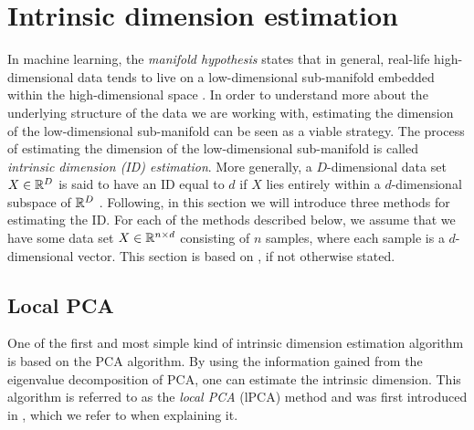 \section{Intrinsic dimension estimation}
In machine learning, the \textit{manifold hypothesis} states that in general, real-life high-dimensional data tends to live on a low-dimensional sub-manifold embedded within the high-dimensional space \cite[p. 16]{bengio2014representation}. In order to understand more about the underlying structure of the data we are working with, estimating the dimension of the low-dimensional sub-manifold can be seen as a viable strategy. The process of estimating the dimension of the low-dimensional sub-manifold is called \textit{intrinsic dimension (ID) estimation}. More generally, a $D$-dimensional data set $X \in \mathbb{R}^D$ is said to have an ID equal to $d$ if $X$ lies entirely within a $d$-dimensional subspace of $\mathbb{R}^D$ \cite{lee2015intrinsic}. Following, in this section we will introduce three methods for estimating the ID. For each of the methods described below, we assume that we have some data set $X \in \mathbb{R}^{n \times d}$ consisting of $n$ samples, where each sample is a $d$-dimensional vector. This section is based on \cite{lee2015intrinsic}, if not otherwise stated.

\subsection{Local PCA}
\label{sec:lpca}
One of the first and most simple kind of intrinsic dimension estimation algorithm is based on the PCA algorithm. By using the information gained from the eigenvalue decomposition of PCA, one can estimate the intrinsic dimension. This algorithm is referred to as the \textit{local PCA} (lPCA) method and was first introduced in \cite{Fukunaga1971}, which we refer to when explaining it.

